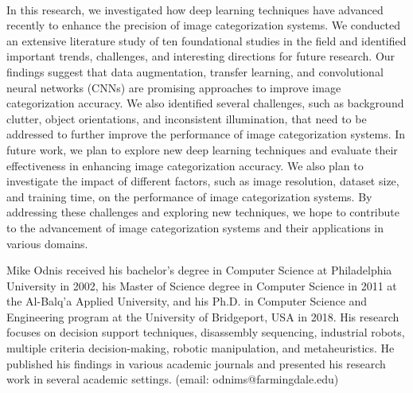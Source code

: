 \documentclass[journal]{IEEEtran}
\begin{document}
\paragraph{} In this research, we investigated how deep learning techniques have advanced recently to enhance the precision of image categorization systems. We conducted an extensive literature study of ten foundational studies in the field and identified important trends, challenges, and interesting directions for future research. Our findings suggest that data augmentation, transfer learning, and convolutional neural networks (CNNs) are promising approaches to improve image categorization accuracy. We also identified several challenges, such as background clutter, object orientations, and inconsistent illumination, that need to be addressed to further improve the performance of image categorization systems. In future work, we plan to explore new deep learning techniques and evaluate their effectiveness in enhancing image categorization accuracy. We also plan to investigate the impact of different factors, such as image resolution, dataset size, and training time, on the performance of image categorization systems. By addressing these challenges and exploring new techniques, we hope to contribute to the advancement of image categorization systems and their applications in various domains.

\newpage

\begin{IEEEbiography}{Mike Odnis} received his bachelor's degree in Computer Science at Philadelphia University in 2002, his Master of Science degree in Computer Science in 2011 at the Al-Balq’a Applied University, and his Ph.D. in Computer Science and Engineering program at the University of Bridgeport, USA in 2018. His research focuses on decision support techniques, disassembly sequencing, industrial robots, multiple criteria decision-making, robotic manipulation, and metaheuristics. He published his findings in various academic journals and presented his research work in several academic settings. (email: odnims@farmingdale.edu)
\end{IEEEbiography}
\end{document}
